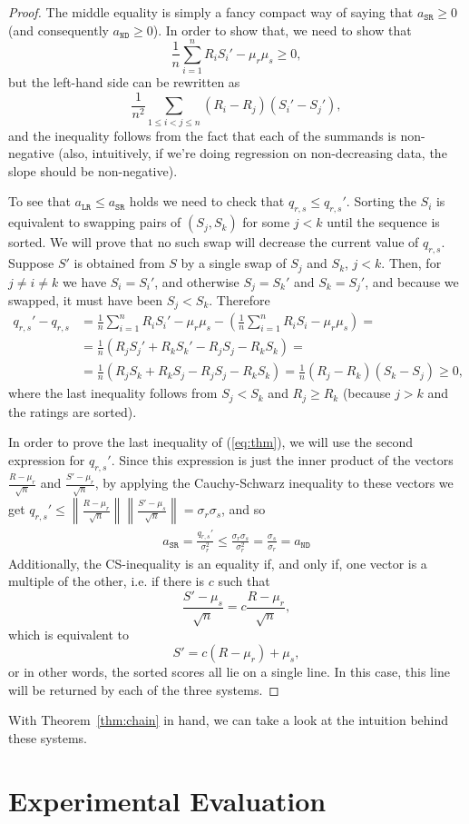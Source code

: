 \documentclass{article}
\newcommand{\artg}{\mu_r}
\newcommand{\ascr}{\mu_s}
\newcommand{\vrtg}{\sigma_r}
\newcommand{\vscr}{\sigma_s}
\newcommand{\cov}{q_{r,s}}
\newcommand{\SR}{\texttt{SR}}
\newcommand{\LR}{\texttt{LR}}
\newcommand{\ND}{\texttt{ND}}
\theoremstyle{definition}
\begin{document}
\begin{proof}
The middle equality is simply a fancy compact way of saying that $a_\SR\geq 0$ (and consequently $a_\ND\geq 0$).
In order to show that, we need to show that
\[\frac{1}{n}\sum_{i=1}^n R_iS_i' - \artg\ascr\geq 0,\]
but the left-hand side can be rewritten as
\[\frac{1}{n^2}\sum_{1\leq i<j\leq n}(R_i-R_j)(S_i'-S_j'),\]
and the inequality follows from the fact that each of the summands is non-negative (also, intuitively, if we're doing regression on non-decreasing data, the slope should be non-negative).

To see that $a_\LR\leq a_\SR$ holds we need to check that $\cov\leq\cov'$.
Sorting the $S_i$ is equivalent to swapping pairs of $(S_j, S_k)$ for some $j<k$ until the sequence is sorted.
We will prove that no such swap will decrease the current value of $\cov$.
Suppose $S'$ is obtained from $S$ by a single swap of $S_j$ and $S_k$, $j<k$.
Then, for $j\neq i\neq k$ we have $S_i=S_i'$, and otherwise $S_j=S_k'$ and $S_k=S_j'$, and because we swapped, it must have been $S_j<S_k$.
Therefore
\begin{align*}
\cov'-\cov&=\frac{1}{n}\sum_{i=1}^n R_iS_i' -\artg\ascr-\left(\frac{1}{n}\sum_{i=1}^n R_iS_i - \artg\ascr\right)=\\
&=\frac{1}{n}\left(R_jS_j' + R_kS_k' - R_jS_j - R_kS_k\right)=\\
&=\frac{1}{n}\left(R_jS_k + R_kS_j - R_jS_j - R_kS_k\right)=\frac{1}{n}(R_j-R_k)(S_k-S_j)\geq0,
\end{align*}
where the last inequality follows from $S_j<S_k$ and $R_j\geq R_k$ (because $j>k$ and the ratings are sorted).

In order to prove the last inequality of (\ref{eq:thm}), we will use the second expression for $\cov'$.
Since this expression is just the inner product of the vectors $\frac{R-\artg}{\sqrt n}$ and $\frac{S'-\artg}{\sqrt n}$, by applying the Cauchy-Schwarz inequality to these vectors we get
$\cov'\leq \left\|\frac{R-\artg}{\sqrt n}\right\|\left\|\frac{S'-\ascr}{\sqrt n}\right\|=\vrtg\vscr$, and so
\begin{align*}
a_\SR=\frac{\cov'}{\vrtg^2}\leq\frac{\vrtg\vscr}{\vrtg^2}=\frac{\vscr}{\vrtg}=a_\ND
\end{align*}
Additionally, the CS-inequality is an equality if, and only if, one vector is a multiple of the other, i.e. if there is $c$ such that
\[\frac{S'-\ascr}{\sqrt n}=c\frac{R-\artg}{\sqrt n},\]
which is equivalent to
\[S'=c(R-\artg)+\ascr,\]
or in other words, the sorted scores all lie on a single line.
In this case, this line will be returned by each of the three systems.
\end{proof}
With Theorem~\ref{thm:chain} in hand, we can take a look at the intuition behind these systems.


\section{Experimental Evaluation}
\end{document}

